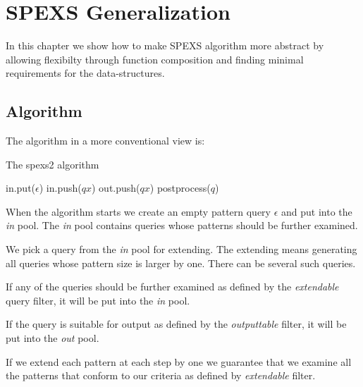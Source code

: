 \chapter{SPEXS Generalization}
\label{c:generalization}

\WIP

In this chapter we show how to make SPEXS algorithm more abstract by allowing flexibilty through function composition and finding minimal requirements for the data-structures.

\section{Algorithm}

The algorithm in a more conventional view is:

\begin{algorithm}[H]
	\caption{The spexs2 algorithm}
\begin{algorithmic}[1]
	\Statex
		\State in.put($\epsilon$)
					\State in.push($qx$)
				\EndIf
					\State out.push($qx$)
				\EndIf
			\EndFor
			\State postprocess($q$)
		\EndWhile
	\EndFunction
\end{algorithmic}
\end{algorithm}

When the algorithm starts we create an empty pattern query $\epsilon$ and put into the \emph{in} pool. The \emph{in} pool contains queries whose patterns should be further examined.

We pick a query from the \emph{in} pool for extending. The extending means generating all queries whose pattern size is larger by one. There can be several such queries.

If any of the queries should be further examined as defined by the \emph{extendable} query filter, it will be put into the \emph{in} pool.

If the query is suitable for output as defined by the \emph{outputtable} filter, it will be put into the \emph{out} pool. 

If we extend each pattern at each step by one we guarantee that we examine all the patterns that conform to our criteria as defined by \emph{extendable} filter.

